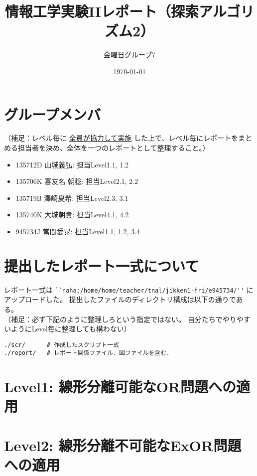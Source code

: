 \documentclass[10pt]{jarticle}
\begin{document}
\title{情報工学実験IIレポート（探索アルゴリズム2）}
\author{金曜日グループ7} %
\date{\today}

\maketitle

 \section*{グループメンバ}
（補足：レベル毎に \underline{全員が協力して実施} した上で、レベル毎にレポートをまとめる担当者を決め、全体を一つのレポートとして整理すること。）
\begin{itemize}
 \item 135712D 山城義弘: 担当Level1.1, 1.2
 \item 135706K 喜友名 朝稔: 担当Level2.1, 2.2
 \item 135719B 澤崎夏希: 担当Level2.3, 3.1
 \item 135740K 大城朝貴: 担当Level4.1, 4.2
 \item 945734J 當間愛晃: 担当Level1.1, 1.2, 3.4
\end{itemize}

\section*{提出したレポート一式について}
レポート一式は
\verb|``naha:/home/home/teacher/tnal/jikken1-fri/e945734/''|
にアップロードした。
提出したファイルのディレクトリ構成は以下の通りである。\\
（補足：必ず下記のように整理しろという指定ではない。
自分たちでやりやすいようにLevel毎に整理しても構わない）
\begin{breakbox}
\begin{verbatim}
./scr/      # 作成したスクリプト一式
./report/   # レポート関係ファイル．図ファイルを含む．
\end{verbatim}
\end{breakbox}

\newpage

\section{Level1: 線形分離可能なOR問題への適用}


\newpage

\section{Level2: 線形分離不可能なExOR問題への適用}

\end{document}
